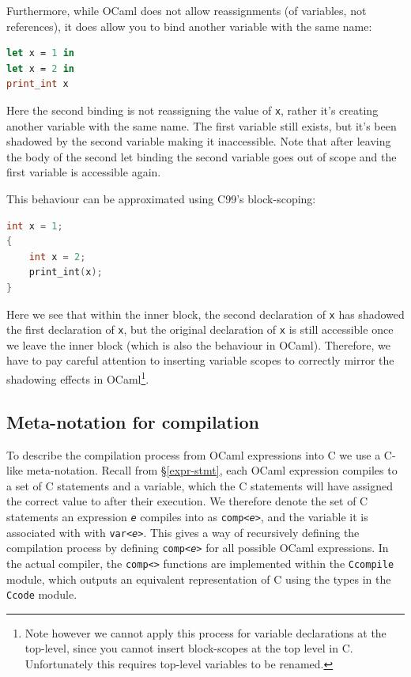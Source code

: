 Furthermore, while OCaml does not allow reassignments (of variables, not 
references), it does allow you to bind another variable with the same name:

\begin{lstlisting}[language=Caml]
let x = 1 in
let x = 2 in
print_int x
\end{lstlisting} 

Here the second binding is not reassigning the value of \texttt{x}, rather it's 
creating another variable with the same name. The first variable still exists, 
but it's been shadowed by the second variable making it inaccessible. Note that 
after leaving the body of the second let binding the second variable goes out 
of scope and the first variable is accessible again.

This behaviour can be approximated using C99's block-scoping:

\begin{lstlisting}[language=C]
int x = 1;
{
    int x = 2;
    print_int(x);
}
\end{lstlisting}

Here we see that within the inner block, the second declaration of \texttt{x}
has shadowed the first declaration of \texttt{x}, but the original declaration
of \texttt{x} is still accessible once we leave the inner block (which is also
the behaviour in OCaml). Therefore, we have to pay careful attention to
inserting variable scopes to correctly mirror the shadowing effects in
OCaml\footnote{Note however we cannot apply this process for variable
    declarations at the top-level, since you cannot insert block-scopes at the
    top level in C. Unfortunately this requires top-level variables to be
renamed.}.

\subsection{Meta-notation for compilation} \label{meta-notation}

To describe the compilation process from OCaml expressions into C we use a
C-like meta-notation. Recall from \S\ref{expr-stmt}, each OCaml expression
compiles to a set of C statements and a variable, which the C statements will
have assigned the correct value to after their execution. We therefore denote
the set of C statements an expression \textit{\texttt{e}} compiles into as
\texttt{comp<\textit{e}>}, and the variable it is associated with with
\texttt{var<\textit{e}>}. This gives a way of recursively defining the
compilation process by defining \texttt{comp<\textit{e}>} for all possible OCaml
expressions. In the actual compiler, the \texttt{comp<>} functions are
implemented within the \texttt{Ccompile} module, which outputs an equivalent
representation of C using the types in the \texttt{Ccode} module.

